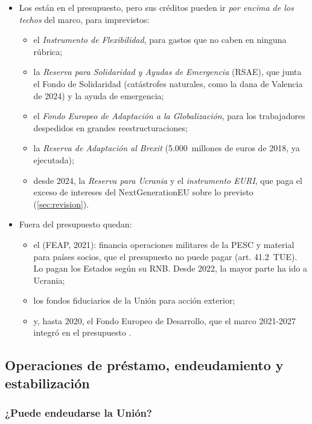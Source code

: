 \documentclass[11pt]{article}
\begin{document}
\begin{itemize}
\item Los  están en el presupuesto, pero sus créditos pueden ir \emph{por encima de los techos} del marco, para imprevistos\nocite{UE2024RevisionMFP}:
  \begin{itemize}
  \item el \emph{Instrumento de Flexibilidad}, para gastos que no caben en ninguna rúbrica;
  \item la \emph{Reserva para Solidaridad y Ayudas de Emergencia} (RSAE), que junta el Fondo de Solidaridad (catástrofes naturales, como la dana de Valencia de 2024) y la ayuda de emergencia;
  \item el \emph{Fondo Europeo de Adaptación a la Globalización}, para los trabajadores despedidos en grandes reestructuraciones;
  \item la \emph{Reserva de Adaptación al Brexit} (5.000~millones de euros de 2018, ya ejecutada);
  \item desde 2024, la \emph{Reserva para Ucrania} y el \emph{instrumento EURI}, que paga el exceso de intereses del NextGenerationEU sobre lo previsto (\ref{sec:revision}).
  \end{itemize}
\item Fuera del presupuesto quedan:
  \begin{itemize}
  \item el  (FEAP, 2021): financia operaciones militares de la PESC y material para países socios, que el presupuesto no puede pagar (art. 41.2~TUE). Lo pagan los Estados según su RNB. Desde 2022, la mayor parte ha ido a Ucrania;
  \item los fondos fiduciarios de la Unión para acción exterior;
  \item y, hasta 2020, el Fondo Europeo de Desarrollo, que el marco 2021-2027 integró en el presupuesto .
  \end{itemize}
\end{itemize}

\subsection{Operaciones de préstamo, endeudamiento y estabilización}\label{sec:prestamos}

\subsubsection{¿Puede endeudarse la Unión?}\label{sec:endeudarse}
\end{document}
